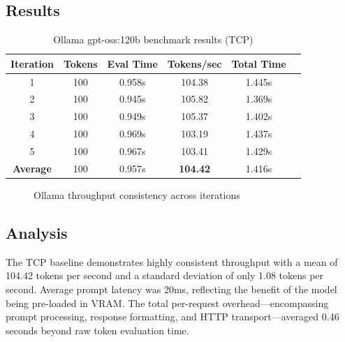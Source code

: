 \documentclass[10pt,letterpaper]{article}
\begin{document}
\subsection{Results}

\begin{table}[H]
\centering
\small
\begin{tabular}{@{}cccccc@{}}
\toprule
\textbf{Iteration} & \textbf{Tokens} & \textbf{Eval Time} & \textbf{Tokens/sec} & \textbf{Total Time} \\
\midrule
1 & 100 & 0.958s & 104.38 & 1.445s \\
2 & 100 & 0.945s & 105.82 & 1.369s \\
3 & 100 & 0.949s & 105.37 & 1.402s \\
4 & 100 & 0.969s & 103.19 & 1.437s \\
5 & 100 & 0.967s & 103.41 & 1.429s \\
\midrule
\textbf{Average} & 100 & 0.957s & \textbf{104.42} & 1.416s \\
\bottomrule
\end{tabular}
\caption{Ollama gpt-oss:120b benchmark results (TCP)}
\end{table}

\begin{figure}[H]
\centering
{}
\caption{Ollama throughput consistency across iterations}
\end{figure}

\subsection{Analysis}

The TCP baseline demonstrates highly consistent throughput with a mean of 104.42 tokens per second and a standard deviation of only 1.08 tokens per second. Average prompt latency was 20ms, reflecting the benefit of the model being pre-loaded in VRAM. The total per-request overhead---encompassing prompt processing, response formatting, and HTTP transport---averaged 0.46 seconds beyond raw token evaluation time.
\end{document}
